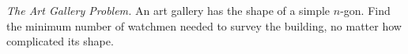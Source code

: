 \emph{The Art Gallery Problem.} An art gallery has the shape of a simple $n$-gon. Find the minimum number of watchmen needed to survey the building, no matter how complicated its shape.
